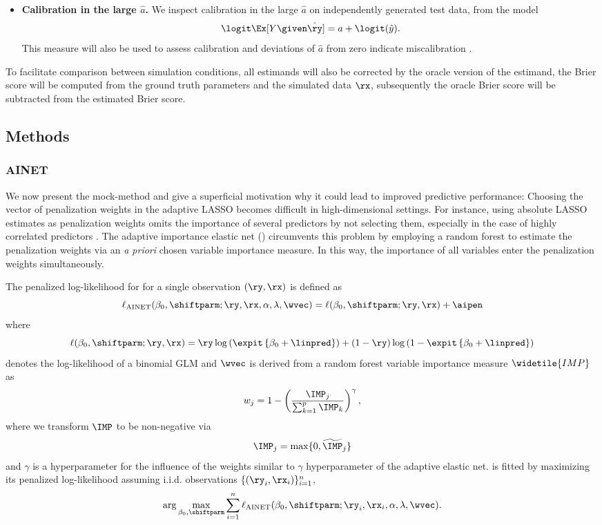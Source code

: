 \begin{subappendices}
\begin{itemize}
  \item \textbf{Calibration in the large $\hat a$.} We inspect calibration in the
  large $\hat a$ on independently generated test data, from the model
  $$\logit\Ex[Y \given \hat\ry] = a + \logit(\hat{y}).$$
        This measure will also be used to assess calibration and deviations of
        $\hat a$ from zero indicate miscalibration \citep{Steyerberg2019}.
\end{itemize}

To facilitate comparison between simulation conditions, all estimands will also
be corrected by the oracle version of the estimand, \eg{} the Brier score will
be computed from the ground truth parameters and the simulated data $\rx$,
subsequently the oracle Brier score will be subtracted from the estimated Brier
score.

\subsection{Methods} \label{sec6:methods}

\subsubsection{AINET}
We now present the mock-method and give a superficial motivation why it could
lead to improved predictive performance: Choosing the vector of penalization
weights in the adaptive LASSO becomes difficult in high-dimensional settings.
For instance, using absolute LASSO estimates as penalization weights omits the
importance of several predictors by not selecting them, especially in the case
of highly correlated predictors \citep{Algamal2015}. The adaptive importance
elastic net (\ainet{}) circumvents this problem by employing a random forest to
estimate the penalization weights via an \emph{a priori} chosen variable
importance measure. In this way, the importance of all variables enter the
penalization weights simultaneously.

The penalized log-likelihood for \ainet{} for a single observation $(\ry, \rx)$
is defined as
$$\ell_{\text{AINET}}(\beta_0, \shiftparm; \ry, \rx, \alpha, \lambda, \wvec) =
  \ell(\beta_0, \shiftparm; \ry, \rx) + \aipen$$
where
$$\ell(\beta_0, \shiftparm; \ry, \rx) =
\ry \log\left(\expit\left\{\beta_0 + \linpred\right\}\right) + (1 - \ry) \log\left(1 - \expit\left\{\beta_0 + \linpred\right\}\right)$$
denotes the log-likelihood of a binomial GLM and $\wvec$ is derived from a
random forest variable importance measure $\widetile{IMP}$ as
$$w_j = 1 - \left(\frac{\IMP_j}{\sum_{k=1}^p \IMP_k}\right)^\gamma,$$
where we transform $\IMP$ to be non-negative via
$$\IMP_j = \max\{0, \widetilde\IMP_j\}$$
and $\gamma$ is a hyperparameter for the influence of the weights similar to
$\gamma$ hyperparameter of the adaptive elastic net. \ainet{} is fitted by
maximizing its penalized log-likelihood assuming i.i.d. observations
$\{(\ry_i, \rx_i)\}_{i=1}^n$, \ie
$$\arg\max_{\beta_0, \shiftparm} \sum_{i = 1}^n \ell_{\text{AINET}}(\beta_0,
\shiftparm; \ry_i, \rx_i, \alpha, \lambda, \wvec).$$


\end{subappendices}
